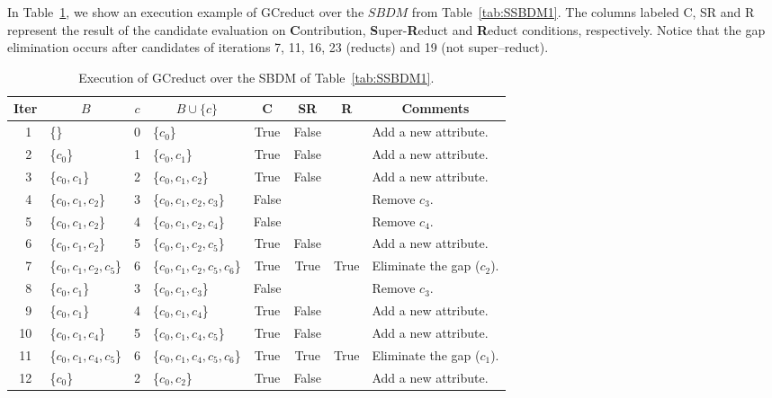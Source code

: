 \documentclass[authoryear,preprint,review,12pt]{elsarticle}
\begin{document}
	In Table~\ref{tab:sample_GCreduct}, we show an execution example of GCreduct over the $SBDM$ from Table~\ref{tab:SSBDM1}.
	The columns labeled C, SR and R represent the result of the candidate evaluation on
	\textbf{C}ontribution, \textbf{S}uper-\textbf{R}educt and \textbf{R}educt conditions, respectively. Notice that
	the gap elimination occurs after candidates of iterations 7, 11, 16, 23 (reducts) and 19 (not super--reduct).
	
	\begin{table}[!htb]
		\caption{Execution of GCreduct over the SBDM of Table~\ref{tab:SSBDM1}.}\label{tab:sample_GCreduct}
      	\centering
    		\begin{tabular}{|c|l|c|l|c|c|c|l|}
    		\hline
    		Iter & \multicolumn{1}{c|}{$B$} & $c$ & \multicolumn{1}{c|}{$B\cup \lbrace c\rbrace$} 
    		& C & SR & R & \multicolumn{1}{c|}{Comments}\\
    		\hline
    		~1 & \{\} 					& 0 & \{$c_0$\} 					& True & False &   & Add a new attribute.\\
    		~2 & \{$c_0$\} 				& 1 & \{$c_0,c_1$\}				& True & False &   & Add a new attribute.\\
    		~3 & \{$c_0,c_1$\} 			& 2 & \{$c_0,c_1,c_2$\}			& True & False &   & Add a new attribute.\\
    		~4 & \{$c_0,c_1,c_2$\} 		& 3 & \{$c_0,c_1,c_2,c_3$\}		& False &   &   & Remove $c_3$.\\
    		~5 & \{$c_0,c_1,c_2$\} 		& 4 & \{$c_0,c_1,c_2,c_4$\}		& False &   &   & Remove $c_4$.\\
    		~6 & \{$c_0,c_1,c_2$\}		& 5 & \{$c_0,c_1,c_2,c_5$\}		& True & False &   & Add a new attribute.\\
    		~7 & \{$c_0,c_1,c_2,c_5$\}	& 6 & \{$c_0,c_1,c_2,c_5,c_6$\} 	& True & True & True & Eliminate the gap ($c_2$).\\
    		~8 & \{$c_0,c_1$\} 			& 3 & \{$c_0,c_1,c_3$\}			& False &   &   & Remove $c_3$.\\
    		~9 & \{$c_0,c_1$\}			& 4 & \{$c_0,c_1,c_4$\}			& True & False &   & Add a new attribute.\\
    		10 & \{$c_0,c_1,c_4$\}		& 5 & \{$c_0,c_1,c_4,c_5$\}		& True & False &   & Add a new attribute.\\
    		11 & \{$c_0,c_1,c_4,c_5$\}	& 6 & \{$c_0,c_1,c_4,c_5,c_6$\} 	& True & True & True & Eliminate the gap ($c_1$).\\
    		12 & \{$c_0$\} 				& 2 & \{$c_0,c_2$\}				& True & False &   & Add a new attribute.\\

\end{tabular}
\end{table}
\end{document}
